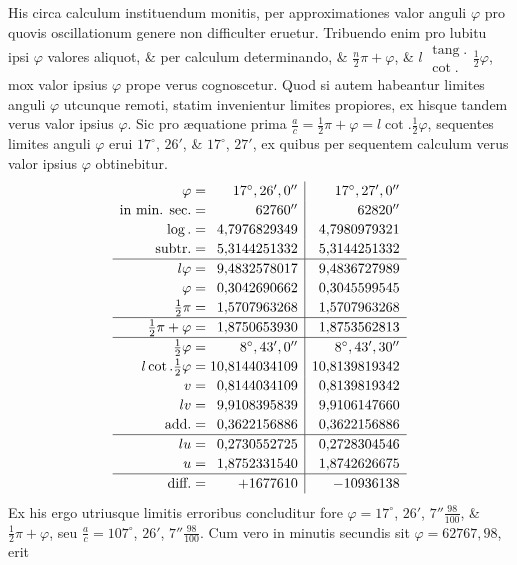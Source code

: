 His circa calculum instituendum monitis, per approximationes valor anguli $\varphi$ pro quovis oscillationum genere non difficulter eruetur. Tribuendo enim pro lubitu ipsi $\varphi$ valores aliquot, \& per calculum determinando, \& $\frac n2\pi+\varphi$, \& $l\begin{smallmatrix}\operatorname{tang}.\\\cot.\end{smallmatrix}\frac12\varphi$, mox valor ipsius $\varphi$ prope verus cognoscetur. Quod si autem habeantur limites anguli $\varphi$ utcunque remoti, statim invenientur limites propiores, ex hisque tandem verus valor ipsius $\varphi$. Sic pro æquatione prima $\frac ac=\frac12\pi+\varphi=l\cot.\frac12\varphi$, sequentes limites anguli $\varphi$ erui $17^\circ$, $26'$, \& $17^\circ$, $27'$, ex quibus per sequentem calculum verus valor ipsius $\varphi$ obtinebitur.
\[\renewcommand{\arraystretch}{1.15}\begin{array}{r@{\;=\;}r|r}
\varphi&17^\circ,26',0''&17^\circ,27',0''\\
\text{in min. sec.}&62760''&62820''\\
\log.&4{,}7976829349&4{,}7980979321\\
\text{subtr.}&5{,}3144251332&5{,}3144251332\\\hline
l\varphi&9{,}4832578017&9{,}4836727989\\
\varphi&0{,}3042690662&0{,}3045599545\\
\frac12\pi&1{,}5707963268&1{,}5707963268\\\hline
\frac12\pi+\varphi&1{,}8750653930&1{,}8753562813\\\hline
\frac12\varphi&8^\circ,43',0''&8^\circ,43',30''\\
l\cot.\frac12\varphi&10{,}8144034109&10{,}8139819342\\
v&0{,}8144034109&0{,}8139819342\\
lv&9{,}9108395839&9{,}9106147660\\
\text{add.}&0{,}3622156886&0{,}3622156886\\\hline
lu&0{,}2730552725&0{,}2728304546\\
u&1{,}8752331540&1{,}8742626675\\\hline
\text{diff.}&+1677610&-10936138
\end{array}\]
Ex his ergo utriusque limitis erroribus concluditur fore $\varphi=17^\circ$, $26'$, $7''\frac{98}{100}$, \& $\frac12\pi+\varphi$, seu $\frac ac=107^\circ$, $26'$, $7''\frac{98}{100}$. Cum vero in minutis secundis sit $\varphi=62767{,}98$, erit
